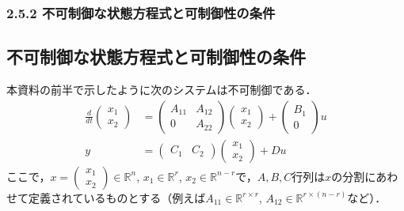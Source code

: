\begin{frame}[t]
\frametitle{2.5.2 不可制御な状態方程式と可制御性の条件}

\subsection{不可制御な状態方程式と可制御性の条件}

本資料の前半で示したように次のシステムは不可制御である．
\begin{align}
 \frac{d}{dt}
  \left(\begin{array}{c}
         {x}_1 \\
	 {x}_2 
	\end{array}\right)
  &=
  \left(\begin{array}{cc}
         {A}_{11} & {A}_{12} \\
	     0        & {A}_{22}
	\end{array}\right)
  \left(\begin{array}{c}
         {x}_1 \\
	 {x}_2 
	\end{array}\right)
  +
  \left(\begin{array}{c}
         {B}_1 \\
	 0
	\end{array}\right)
  u 
\label{eq:uncontrollable1D}\\
 y &=
  \left(\begin{array}{cc}
         {C}_1 & {C}_2 
	\end{array}\right)
  \left(\begin{array}{c}
         {x}_1 \\
	 {x}_2 
	\end{array}\right)
  + D u
\label{eq:uncontrollable2D}
\end{align}
ここで，$x = \left(\begin{array}{c} {x}_1 \\ {x}_2 \end{array}\right) \in {\mathbb R}^n$, 
$x_1 \in {\mathbb R}^r$, $x_2 \in {\mathbb R}^{n-r}$で，$A,B,C$行列は$x$の分割にあわせて定義されているものとする（例えば$A_{11} \in {\mathbb R}^{r \times r}$, $A_{12} \in {\mathbb R}^{r \times (n-r)}$など）．

\end{frame}

